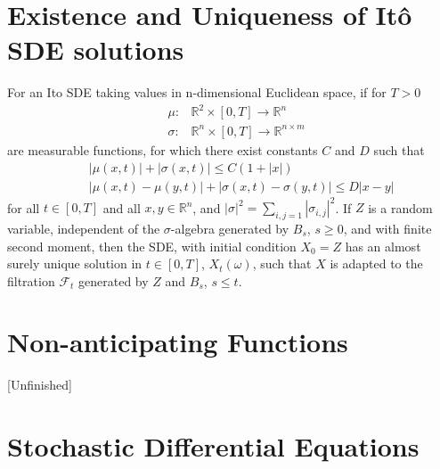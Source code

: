 \documentclass[12pt]{report}
\begin{document}
\section{Existence and Uniqueness of It\^{o} SDE solutions}
For an Ito SDE taking values in n-dimensional Euclidean space, if for $T>0$\\
\begin{eqnarray*}
&\mu:&\mathbb{R}^2\times[0,T]\rightarrow \mathbb{R}^n\\
&\sigma:&\mathbb{R}^n \times[0,T] \rightarrow \mathbb{R}^{n\times m}
\end{eqnarray*}
are measurable functions, for which there exist constants $C$ and $D$ such that 
\begin{eqnarray*}
&&|\mu(x,t)|+|\sigma(x,t)|\leq C(1+|x|)\\
&&|\mu(x,t)-\mu(y,t)|+|\sigma(x,t)-\sigma(y,t)|\leq D|x-y|
\end{eqnarray*}
for all $t\in [0,T]$ and all $x,y\in \mathbb{R}^n$, and $|\sigma|^2=\sum_{i,j=1}|\sigma_{i,j}|^2$. 
If $Z$ is a random variable, independent of the $\sigma$-algebra generated by $B_s$, $s\geq 0$, and with finite second moment, then the SDE, with initial condition $X_0=Z$ has an almost surely unique solution in $t\in[0,T]$, $X_t(\omega)$, such that $X$ is adapted to the filtration $\mathcal{F}_t$ generated by $Z$ and $B_s$, $s\leq t$.

\section{Non-anticipating Functions}{[Unfinished]}

\section{Stochastic Differential Equations}




\end{document}
